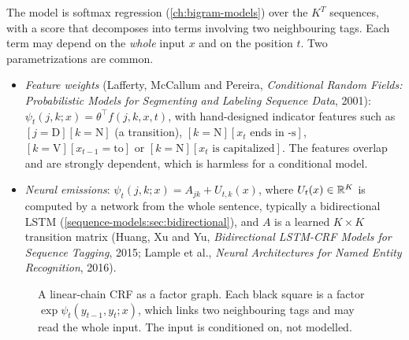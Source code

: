 \begin{notechapter}
The model is softmax regression (\cref{ch:bigram-models}) over the $K^T$ sequences, with a score that
decomposes into terms involving two neighbouring tags. Each term may depend on the
\emph{whole} input $x$ and on the position $t$. Two parametrizations are common.
\begin{itemize}
  \item \emph{Feature weights} (Lafferty, McCallum and Pereira, \emph{Conditional Random Fields:
        Probabilistic Models for Segmenting and Labeling Sequence Data}, 2001):
        $\psi_t(j, k; x) = \theta^\top f(j, k, x, t)$, with hand-designed indicator features such as $[j = \mathrm D][k = \mathrm N]$ (a transition),
        $[k = \mathrm N][x_t\text{ ends in -s}]$, $[k = \mathrm V][x_{t-1} = \text{to}]$ or $[k = \mathrm N][x_t\text{ is capitalized}]$. The features overlap and are strongly
        dependent, which is harmless for a conditional model.
  \item \emph{Neural emissions}: $\psi_t(j, k; x) = A_{jk} + U_{t,k}(x)$, where $U_t(x)\in\mathbb{R}^K$ is computed by a network from the whole
        sentence, typically a bidirectional LSTM (\cref{sequence-models:sec:bidirectional}), and $A$ is a learned
        $K\times K$ transition matrix (Huang, Xu and Yu, \emph{Bidirectional LSTM-CRF Models for Sequence
        Tagging}, 2015; Lample et al., \emph{Neural Architectures for Named Entity Recognition},
        2016).
\end{itemize}

\begin{figure}[ht]
\centering
{}
\caption{A linear-chain CRF as a factor graph. Each black square is a factor $\exp\psi_t(y_{t-1}, y_t; x)$, which links two
neighbouring tags and may read the whole input. The input is conditioned on, not modelled.}
\label{crf:fig:graph}
\end{figure}


\end{notechapter}
